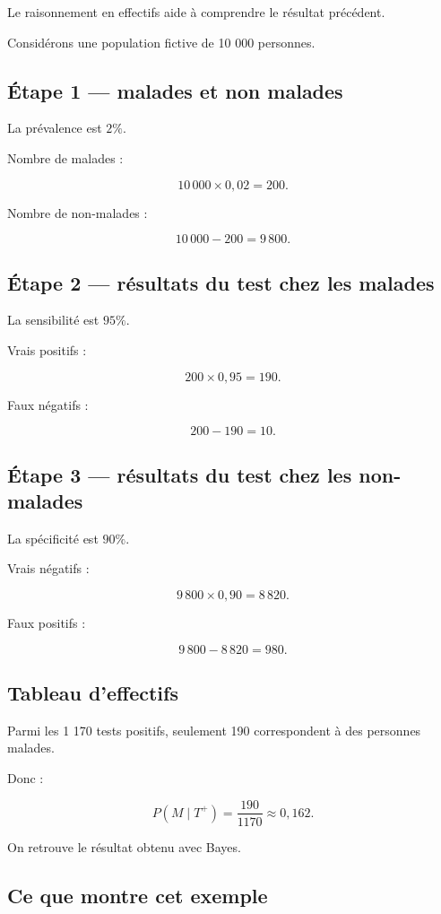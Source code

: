 Le raisonnement en effectifs aide à comprendre le résultat précédent.

Considérons une population fictive de 10 000 personnes.

\subsection{Étape 1 — malades et non malades}

La prévalence est $2\%$.

Nombre de malades :

\[
10\,000\times0{,}02=200.
\]

Nombre de non-malades :

\[
10\,000-200=9\,800.
\]

\subsection{Étape 2 — résultats du test chez les malades}

La sensibilité est $95\%$.

Vrais positifs :

\[
200\times0{,}95=190.
\]

Faux négatifs :

\[
200-190=10.
\]

\subsection{Étape 3 — résultats du test chez les non-malades}

La spécificité est $90\%$.

Vrais négatifs :

\[
9\,800\times0{,}90=8\,820.
\]

Faux positifs :

\[
9\,800-8\,820=980.
\]

\subsection{Tableau d'effectifs}


Parmi les 1 170 tests positifs, seulement 190 correspondent à des personnes malades.

Donc :

\[
P(M\mid T^+)
=
\frac{190}{1170}
\approx0{,}162.
\]

On retrouve le résultat obtenu avec Bayes.

\subsection{Ce que montre cet exemple}

